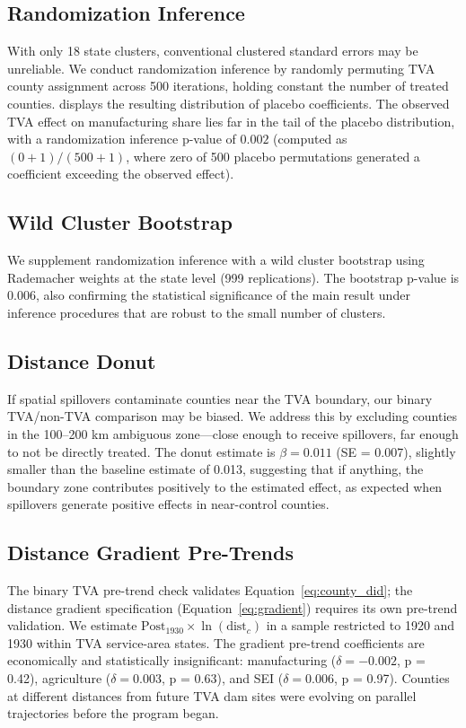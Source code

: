 \documentclass[12pt]{article}
\begin{document}
\subsection{Randomization Inference}

With only 18 state clusters, conventional clustered standard errors may be unreliable. We conduct randomization inference by randomly permuting TVA county assignment across 500 iterations, holding constant the number of treated counties.  displays the resulting distribution of placebo coefficients. The observed TVA effect on manufacturing share lies far in the tail of the placebo distribution, with a randomization inference p-value of $0.002$ (computed as $(0 + 1)/(500 + 1)$, where zero of 500 placebo permutations generated a coefficient exceeding the observed effect).

\subsection{Wild Cluster Bootstrap}

We supplement randomization inference with a wild cluster bootstrap using Rademacher weights at the state level (999 replications). The bootstrap p-value is 0.006, also confirming the statistical significance of the main result under inference procedures that are robust to the small number of clusters.

\subsection{Distance Donut}

If spatial spillovers contaminate counties near the TVA boundary, our binary TVA/non-TVA comparison may be biased. We address this by excluding counties in the 100--200 km ambiguous zone---close enough to receive spillovers, far enough to not be directly treated. The donut estimate is $\beta = 0.011$ (SE = 0.007), slightly smaller than the baseline estimate of 0.013, suggesting that if anything, the boundary zone contributes positively to the estimated effect, as expected when spillovers generate positive effects in near-control counties.

\subsection{Distance Gradient Pre-Trends}

The binary TVA pre-trend check validates Equation~\eqref{eq:county_did}; the distance gradient specification (Equation~\eqref{eq:gradient}) requires its own pre-trend validation. We estimate $\text{Post}_{1930} \times \ln(\text{dist}_c)$ in a sample restricted to 1920 and 1930 within TVA service-area states. The gradient pre-trend coefficients are economically and statistically insignificant: manufacturing ($\delta = -0.002$, p = 0.42), agriculture ($\delta = 0.003$, p = 0.63), and SEI ($\delta = 0.006$, p = 0.97). Counties at different distances from future TVA dam sites were evolving on parallel trajectories before the program began.
\end{document}
